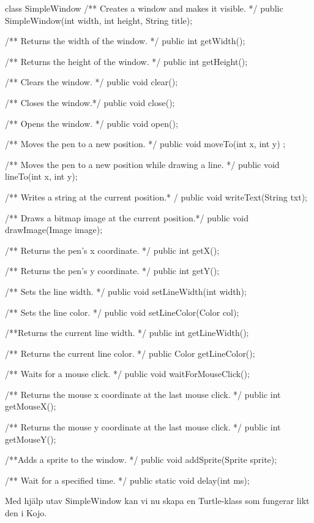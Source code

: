 \begin{JavaSpec}{class SimpleWindow}
	/** Creates a window and makes it visible. */
	public SimpleWindow(int width, int height, String title);

	/** Returns the width of the window. */
	public int getWidth();

	/** Returns the height of the window. */
	public int getHeight();

	/** Clears the window. */
	public void clear();

	/** Closes the window.*/
	public void close();

	/** Opens the window. */
	public void open(); 

	/** Moves the pen to a new position. */
	public void moveTo(int x, int y) ;

	/** Moves the pen to a new position while drawing a line. */
	public void lineTo(int x, int y);

	/** Writes a string at the current position.* /
	public void writeText(String txt);
	
	/** Draws a bitmap image at the current position.*/
	public void drawImage(Image image);

	/** Returns the pen's x coordinate. */
	public int getX();

	/** Returns the pen's y coordinate. */
	public int getY();

	/** Sets the line width.  */
	public void setLineWidth(int width);

	/** Sets the line color. */
	public void setLineColor(Color col);

	/**Returns the current line width. */
	public int getLineWidth();

	/** Returns the current line color. */
	public Color getLineColor();
	
	/**  Waits for a mouse click. */
	public void waitForMouseClick();

	/** Returns the mouse x coordinate at the last mouse click. */
	public int getMouseX();

	/** Returns the mouse y coordinate at the last mouse click. */
	public int getMouseY();

	/**Adds a sprite to the window. */
	public void addSprite(Sprite sprite);

	/** Wait for a specified time. */
	public static void delay(int ms);


\end{JavaSpec}

Med hjälp utav SimpleWindow kan vi nu skapa en Turtle-klass som fungerar likt den i Kojo. 

